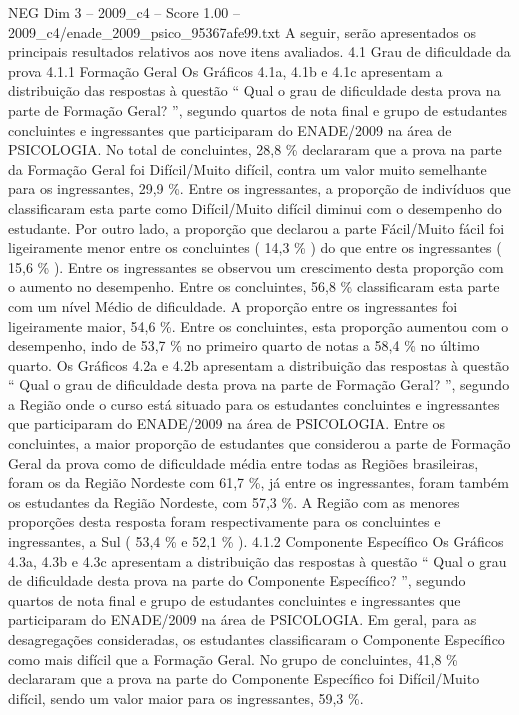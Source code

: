 \begin{textsample}{NEG Dim 3 – 2009\_c4 – Score 1.00 – 2009\_c4/enade\_2009\_psico\_95367afe99.txt}
A seguir, serão apresentados os principais resultados relativos aos nove itens avaliados. 4.1 Grau de dificuldade da prova 4.1.1 Formação Geral Os Gráficos 4.1a, 4.1b e 4.1c apresentam a distribuição das respostas à questão “ Qual o grau de dificuldade desta prova na parte de Formação Geral? ”, segundo quartos de nota final e grupo de estudantes concluintes e ingressantes que participaram do ENADE/2009 na área de PSICOLOGIA.
No total de concluintes, 28,8 \% declararam que a prova na parte da Formação Geral foi Difícil/Muito difícil, contra um valor muito semelhante para os ingressantes, 29,9 \%.
Entre os ingressantes, a proporção de indivíduos que classificaram esta parte como Difícil/Muito difícil diminui com o desempenho do estudante.
Por outro lado, a proporção que declarou a parte Fácil/Muito fácil foi ligeiramente menor entre os concluintes ( 14,3 \% ) do que entre os ingressantes ( 15,6 \% ).
Entre os ingressantes se observou um crescimento desta proporção com o aumento no desempenho.
Entre os concluintes, 56,8 \% classificaram esta parte com um nível Médio de dificuldade.
A proporção entre os ingressantes foi ligeiramente maior, 54,6 \%.
Entre os concluintes, esta proporção aumentou com o desempenho, indo de 53,7 \% no primeiro quarto de notas a 58,4 \% no último quarto.
Os Gráficos 4.2a e 4.2b apresentam a distribuição das respostas à questão “ Qual o grau de dificuldade desta prova na parte de Formação Geral? ”, segundo a Região onde o curso está situado para os estudantes concluintes e ingressantes que participaram do ENADE/2009 na área de PSICOLOGIA.
Entre os concluintes, a maior proporção de estudantes que considerou a parte de Formação Geral da prova como de dificuldade média entre todas as Regiões brasileiras, foram os da Região Nordeste com 61,7 \%, já entre os ingressantes, foram também os estudantes da Região Nordeste, com 57,3 \%.
A Região com as menores proporções desta resposta foram respectivamente para os concluintes e ingressantes, a Sul ( 53,4 \% e 52,1 \% ). 4.1.2 Componente Específico Os Gráficos 4.3a, 4.3b e 4.3c apresentam a distribuição das respostas à questão “ Qual o grau de dificuldade desta prova na parte do Componente Específico? ”, segundo quartos de nota final e grupo de estudantes concluintes e ingressantes que participaram do ENADE/2009 na área de PSICOLOGIA.
Em geral, para as desagregações consideradas, os estudantes classificaram o Componente Específico como mais difícil que a Formação Geral.
No grupo de concluintes, 41,8 \% declararam que a prova na parte do Componente Específico foi Difícil/Muito difícil, sendo um valor maior para os ingressantes, 59,3 \%.

\end{textsample}
